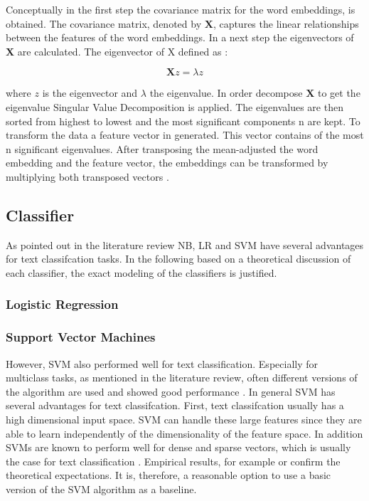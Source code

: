 \documentclass[12pt, a4paper, titlepage]{article}
\begin{document}
Conceptually in the first step the covariance matrix for the word embeddings, is obtained. The covariance matrix, denoted by $\textbf{X}$, captures the linear relationships between the features of the word embeddings. In a next step the eigenvectors of $\textbf{X}$ are calculated. The eigenvector of X defined as \citep{bro2014}: 

\[ \textbf{X}z = \lambda z \]

where $z$ is the eigenvector and $\lambda$ the eigenvalue. In order decompose $\textbf{X}$ to get the eigenvalue Singular Value Decomposition is applied. The eigenvalues are then sorted from highest to lowest and the most significant components n are kept. To transform the data a feature vector in generated. This vector contains of the most n significant eigenvalues. After transposing the mean-adjusted the word embedding and the feature vector, the embeddings can be transformed by multiplying both transposed vectors \citep{smith2002}.

\subsection{Classifier}
As pointed out in the literature review \ac{NB}, \ac{LR} and \ac{SVM} have several advantages for text classifcation tasks. In the following based on a theoretical discussion of each classifier, the exact modeling of the classifiers is justified. 

\subsubsection{Logistic Regression}

\subsubsection{Support Vector Machines}
However, \ac{SVM} also performed well for text classification. Especially for multiclass tasks, as mentioned in the literature review, often different versions of the algorithm are used and showed good performance \citep{Aiolli2005,Angulo2003,Benabdeslem2006,Guo2015,Mayoraz1999,Tang2019,Tomar2015}. In general \ac{SVM} has several advantages for text classifcation. First, text classifcation usually has a high dimensional input space. \ac{SVM} can handle these large features since they are able to learn independently of the dimensionality of the feature space. In addition \ac{SVM}s are known to perform well for dense and sparse vectors, which is usually the case for text classification \citep{Joachims1998}. Empirical results, for example \citet{Joachims1998} or \cite{Liu2010} confirm the theoretical expectations. It is, therefore, a reasonable option to use a basic version of the \ac{SVM} algorithm as a baseline.
\end{document}
